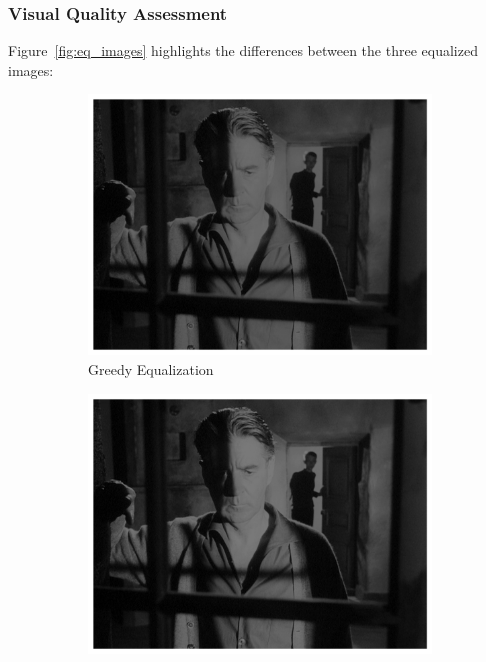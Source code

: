 \documentclass[12pt,a4paper]{article}
\begin{document}
\subsubsection{Visual Quality Assessment}

Figure~\ref{fig:eq_images} highlights the differences between the three equalized images:

\begin{figure}[H]
    \centering
    \begin{subfigure}{0.32\textwidth}
        \includegraphics[width=\textwidth]{results/images/equalized_greedy.png}
        \caption{Greedy Equalization}
    \end{subfigure}
    \hfill
    \begin{subfigure}{0.32\textwidth}
        \includegraphics[width=\textwidth]{results/images/equalized_non-greedy.png}

\end{subfigure}
\end{figure}
\end{document}
